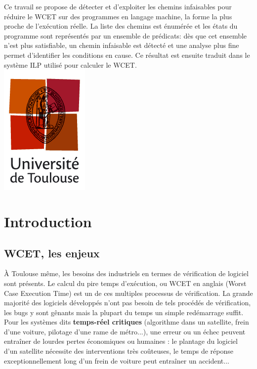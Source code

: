 \documentclass[french]{article}
\begin{document}
\begin{titlepage}
{    Ce travail se propose de détecter et d'exploiter les chemins
    infaisables pour réduire le WCET sur des programmes en langage machine,
    la forme la plus proche de l'exécution réelle. La liste des chemins
    est énumérée et les états du programme sont représentés par un
    ensemble de prédicats: dès que cet ensemble n'est plus satisfiable,
    un chemin infaisable est détecté et une analyse plus fine
    permet d'identifier les conditions en cause. Ce résultat
    est ensuite traduit dans le système ILP utilisé pour calculer le WCET.
  }\\
  \vfill
  \center
    \includegraphics[scale=0.5]{pictures/logo_univ_tlse.png}\\
  \end{titlepage}

  \pagebreak{}
  \tableofcontents{}


  \newpage{}
  \section{Introduction}
  \subsection{WCET, les enjeux}
  \`A Toulouse même, les besoins des industriels en termes de vérification de logiciel sont présents. Le calcul du pire temps d'exécution, ou WCET en anglais (Worst Case Execution Time) est un de ces multiples processus de vérification. La grande majorité des logiciels développés n'ont pas besoin de tels procédés de vérification, les bugs y sont gênants mais la plupart du temps un simple redémarrage suffit. Pour les systèmes dits \textbf{temps-réel critiques} (algorithme dans un satellite, frein d'une voiture, pilotage d'une rame de métro...), une erreur ou un échec peuvent entraîner de lourdes pertes économiques ou humaines : le plantage du logiciel d'un satellite nécessite des interventions très coûteuses, le temps de réponse exceptionnellement long d'un frein de voiture peut entraîner un accident...
\end{document}
